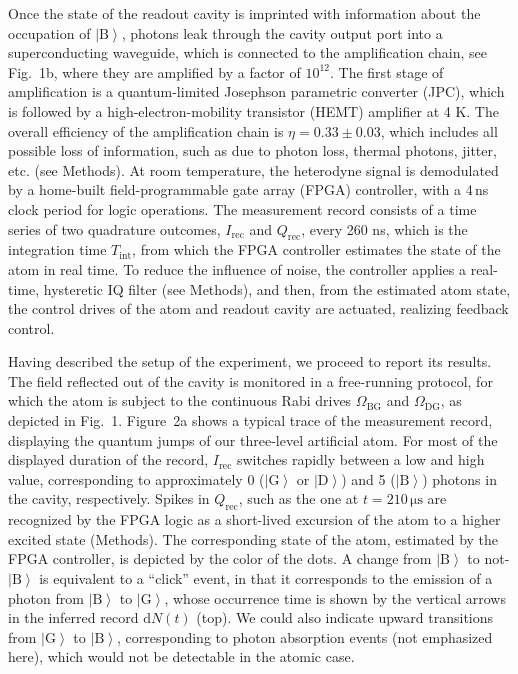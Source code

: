 \documentclass[
	 			preprint,     		superscriptaddress, 																longbibliography,
		amsmath, amssymb,
		aps,  prb,   		floatfix,
		linenumbers     
	]{revtex4-1}
\newcommand{\ket}[1]{\left|#1\right>}
\begin{document}
Once the state of the readout cavity is imprinted with information about the occupation of $\ket{\mathrm{B}}$, photons leak through the cavity output port into a superconducting waveguide, which is connected to the amplification chain, see Fig.~1b, where they are amplified by a factor of $10^{12}$. 
The first stage of amplification is a quantum-limited Josephson parametric converter (JPC), which is followed by a high-electron-mobility transistor (HEMT) amplifier at 4 K.
The overall efficiency of the amplification chain is $\eta = 0.33 \pm 0.03$, which includes all possible loss of information, such as due to photon loss, thermal photons, jitter, etc. (see Methods). At room temperature, the heterodyne signal is demodulated by a home-built field-programmable gate array (FPGA) controller, with a 4\,ns clock period for logic operations. 
The measurement record  consists of a time series of two quadrature outcomes, $I_\mathrm{rec}$ and $Q_\mathrm{rec}$,  every 260 ns,
which is the integration time $T_\mathrm{int}$,
from which the FPGA controller estimates the state of the atom in real time.
To reduce the influence of noise, the controller applies a real-time, hysteretic IQ filter (see Methods), and then, from the estimated atom state,  the control drives of the atom and readout cavity are actuated, realizing feedback control.




 

Having described  the setup of the experiment, we proceed to report its  results. 
The field reflected out of the cavity is monitored in a free-running protocol, for which the atom is subject to the continuous Rabi drives $\Omega_\mathrm{BG}$ and $\Omega_\mathrm{DG}$, as depicted in Fig.~1.
Figure~2a shows a typical trace of the measurement record, displaying the quantum jumps of our three-level artificial atom. 
For most of the displayed duration of the record, $I_\mathrm{rec}$  switches rapidly between a low and high value, corresponding to approximately 0 ($\ket{\mathrm{G}}$ or $\ket{\mathrm{D}}$) and 5 ($\ket{\mathrm{B}}$) photons in the cavity, respectively. Spikes in $Q_\mathrm{rec}$, such as the one at $t=210\,\mathrm{\mu s}$ are recognized by the FPGA logic as a short-lived excursion of the atom to a higher excited state (Methods).
The corresponding  state of the atom, estimated by the FPGA controller, is depicted by the  color of the dots.
A change from $\ket{\mathrm{B}}$  to not-$\ket{\mathrm{B}}$ is equivalent to a ``click'' event, in that it corresponds to the emission of a photon from $\ket{\mathrm{B}}$ to $\ket{\mathrm{G}}$, whose occurrence time is shown by the vertical  arrows in the inferred record $\mathrm dN\left(t\right)$ (top). 
We could also indicate upward transitions from $\ket{\mathrm{G}}$ to $\ket{\mathrm{B}}$, corresponding to photon absorption events (not emphasized here), which would not be detectable in the atomic case.
\end{document}
